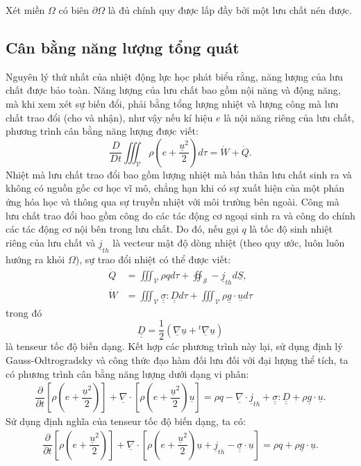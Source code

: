 \documentclass[../../../main.tex]{subfiles}
\begin{document}
Xét miền $\Omega$ có biên $\partial\Omega$ là đủ chính quy được lấp đầy bởi một lưu chất nén được.
\subsection{Cân bằng năng lượng tổng quát}
    Nguyên lý thứ nhất của nhiệt động lực học phát biểu rằng, năng lượng của lưu chất được bảo toàn. Năng lượng của lưu chất bao gồm nội năng và động năng, mà khi xem xét sự biến đổi, phải bằng tổng lượng nhiệt và lượng công mà lưu chất trao đổi (cho và nhận), như vậy nếu kí hiệu $e$ là nội năng riêng của lưu chất, phương trình cân bằng năng lượng được viết:
        \[
            \dfrac{D}{Dt}\iiint_\mathscr{V}\rho\left(e+\dfrac{\underline{u}^2}{2}\right)d\tau=\dot{W}+\dot{Q}.
            \]
    Nhiệt mà lưu chất trao đổi bao gồm lượng nhiệt mà bản thân lưu chất sinh ra và không có nguồn gốc cơ học vĩ mô, chẳng hạn khi có sự xuất hiện của một phản ứng hóa học và thông qua sự truyền nhiệt với môi trường bên ngoài. Công mà lưu chất trao đổi bao gồm công do các tác động cơ ngoại sinh ra và công do chính các tác động cơ nội bên trong lưu chất. Do đó, nếu gọi $q$ là tốc độ sinh nhiệt riêng của lưu chất và $\underline{j}_{th}$ là vecteur mật độ dòng nhiệt (theo quy ước, luôn luôn hướng ra khỏi $\Omega$), sự trao đổi nhiệt có thể được viết:
    \[
            \begin{aligned}
                \dot{Q}&=\iiint_\mathscr{V}\rho qd\tau+\oiint_\mathscr{S} -\underline{j}_{th}d\underline{S},\\
                \dot{W}&=\iiint_\mathscr{V}\underline{\underline{\sigma}}:\underline{\underline{D}}d\tau+\iiint_\mathscr{V}\rho \underline{g}\cdot\underline{u}d\tau
            \end{aligned}
        \]
    trong đó
        \[
            \underline{\underline{D}}=\dfrac{1}{2}\left(\underline{\nabla}\underline{u} +{}^t\underline{\nabla}\underline{u}\right)
        \]
    là tenseur tốc độ biến dạng. Kết hợp các phương trình này lại, sử dụng định lý Gauss-Odtrogradsky và công thức đạo hàm đối lưu đối với đại lượng thể tích, ta có phương trình cân bằng năng lượng dưới dạng vi phân:
    \begin{align}
        \dfrac{\partial}{\partial t}\left[\rho\left(e+\dfrac{\underline{u}^2}{2}\right)\right]+\underline{\nabla}\cdot\left[\rho\left(e+\dfrac{\underline{u}^2}{2}\right)\underline{u}\right]=\rho q-\underline{\nabla}\cdot\underline{j}_{th}+\underline{\underline{\sigma}}:\underline{\underline{D}}+\rho\underline{g}\cdot\underline{u}.
    \end{align}
    Sử dụng định nghĩa của tenseur tốc độ biến dạng, ta có:
        \begin{align}\label{eq:conserver_energie}
            \dfrac{\partial}{\partial t}\left[\rho\left(e+\dfrac{\underline{u}^2}{2}\right)\right]+\underline{\nabla}\cdot\left[\rho\left(e+\dfrac{\underline{u}^2}{2}\right)\underline{u}+\underline{j}_{th}-\underline{\underline{\sigma}}\cdot\underline{u}\right]=\rho q+\rho\underline{g}\cdot\underline{u}.
        \end{align}
\end{document}
